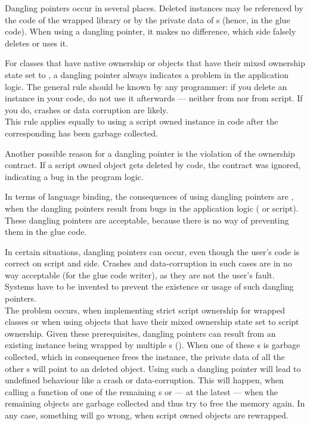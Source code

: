 Dangling pointers occur in several places. Deleted instances may be referenced by the  code of the wrapped library or by the private data of s (hence, in the glue code). When using a dangling pointer, it makes no difference, which side falsely deletes or uses it.

For classes that have native ownership or objects that have their mixed ownership state set to , a dangling pointer always indicates a problem in the application logic. The general rule should be known by any  programmer: if you delete an instance in your  code, do not use it afterwards --- neither from  nor from script. If you do, crashes or data corruption are likely.\\
This rule applies equally to using a script owned instance in  code after the corresponding  has been garbage collected.

Another possible reason for a dangling pointer is the violation of the ownership contract. If a script owned object gets deleted by  code, the contract was ignored, indicating a bug in the program logic.

In terms of language binding, the consequences of using dangling pointers are \linebreak{}, when the dangling pointers result from bugs in the application logic ( or script). These dangling pointers are acceptable, because there is no way of preventing them in the glue code.

In certain situations, dangling pointers can occur, even though the user's code is correct on script and  side. Crashes and data-corruption in such cases are in no way acceptable (for the glue code writer), as they are not the user's fault. Systems have to be invented to prevent the existence or usage of such dangling pointers.\\
The problem occurs, when implementing strict script ownership for wrapped classes or when using objects that have their mixed ownership state set to script ownership. Given these prerequisites, dangling pointers can result from an existing  instance being wrapped by multiple s (). When one of these s is garbage collected, which in consequence frees the  instance, the private data of all the other s will point to an deleted object. Using such a dangling pointer will lead to undefined behaviour like a crash or data-corruption. This will happen, when calling a function of one of the remaining s or --- at the latest --- when the remaining objects are garbage collected and thus try to free the memory again. In any case, something will go wrong, when script owned objects are rewrapped.


